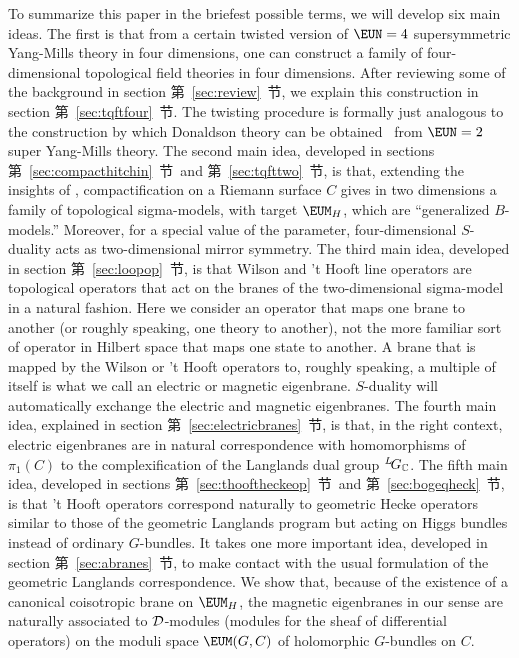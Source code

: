 To summarize this paper in the briefest possible terms, we will
develop six main ideas.   The first is that from a certain twisted
version of ${\EUN}=4$ supersymmetric Yang-Mills theory in four
dimensions, one can construct a family of four-dimensional
topological field theories in four dimensions. After reviewing
some of the background in section 第~\ref{sec:review}~节, we explain this
construction in section 第~\ref{sec:tqftfour}~节. The twisting procedure is
formally just analogous to the construction by which Donaldson
theory can be obtained \cite{ref25}\ from ${\EUN}=2$ super Yang-Mills
theory. The second main idea, developed in sections
第~\ref{sec:compacthitchin}~节\ and 第~\ref{sec:tqfttwo}~节, is that, extending the insights of
\cite{ref18,ref19}, compactification on a Riemann surface $C$ gives
in two dimensions a family of topological sigma-models, with
target ${\EUM}_H$, which are ``generalized $B$-models.'' Moreover,
for a special value of the parameter, four-dimensional $S$-duality
acts as two-dimensional mirror symmetry.  The third main idea,
developed in section 第~\ref{sec:loopop}~节, is that Wilson and 't Hooft line
operators are topological operators that act on the branes of the
two-dimensional sigma-model in a natural fashion. Here we consider
an operator that maps one brane to another (or roughly speaking,
one theory to another), not the more familiar sort of operator in
Hilbert space that maps one state to another. A brane that is
mapped by the Wilson or 't Hooft operators to, roughly speaking, a
multiple of itself is what we call an electric or magnetic
eigenbrane. $S$-duality will automatically exchange the electric
and magnetic eigenbranes. The fourth main idea, explained in
section 第~\ref{sec:electricbranes}~节, is that, in the right context, electric
eigenbranes are in natural correspondence with homomorphisms of
$\pi_1(C)$ to the complexification of the Langlands dual group
$^L\negthinspace G_{\Bbb{C}}$. The fifth main idea, developed in
sections 第~\ref{sec:thooftheckeop}~节\ and 第~\ref{sec:bogeqheck}~节, is that 't Hooft
operators correspond naturally to geometric Hecke operators
similar to those of the geometric Langlands program but acting on
Higgs bundles instead of ordinary $G$-bundles. It takes one more
important idea, developed in section 第~\ref{sec:abranes}~节, to make contact
with the usual formulation of the geometric Langlands
correspondence. We show that, because of the existence of a
canonical coisotropic brane on ${\EUM}_H$, the magnetic
eigenbranes in our sense are naturally associated to ${\cal
D}$-modules (modules for the sheaf of differential operators) on
the moduli space ${\EUM}(G,C)$ of holomorphic $G$-bundles on $C$.

